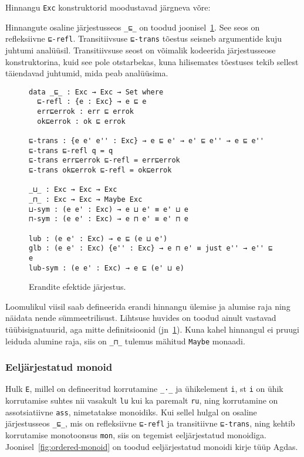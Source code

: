 \documentclass[a4paper,12pt]{article}
\begin{document}
Hinnangu {\tt Exc} konstruktorid moodustavad järgneva võre:
\begin{center}
\end{center}
Hinnangute osaline järjestusseos {\tt _⊑_} on toodud joonisel~\ref{fig:exc.ord}.
See seos on refleksiivne {\tt ⊑-refl}.
Transitiivsuse {\tt ⊑-trans} tõestus seisneb argumentide kuju juhtumi analüüsil.
Transitiivsuse seost on võimalik kodeerida järjestusseose konstruktorina, kuid see pole otstarbekas,
kuna hilisemates tõestuses tekib sellest täiendavad juhtumid, mida peab analüüsima.

\begin{figure}
  \begin{BVerbatim}
data _⊑_ : Exc → Exc → Set where
  ⊑-refl : {e : Exc} → e ⊑ e
  err⊑errok : err ⊑ errok
  ok⊑errok : ok ⊑ errok
  
⊑-trans : {e e' e'' : Exc} → e ⊑ e' → e' ⊑ e'' → e ⊑ e''
⊑-trans ⊑-refl q = q
⊑-trans err⊑errok ⊑-refl = err⊑errok
⊑-trans ok⊑errok ⊑-refl = ok⊑errok

_⊔_ : Exc → Exc → Exc
_⊓_ : Exc → Exc → Maybe Exc
⊔-sym : (e e' : Exc) → e ⊔ e' ≡ e' ⊔ e
⊓-sym : (e e' : Exc) → e ⊓ e' ≡ e' ⊓ e

lub : (e e' : Exc) → e ⊑ (e ⊔ e')
glb : (e e' : Exc) {e'' : Exc} → e ⊓ e' ≡ just e'' → e'' ⊑ e
lub-sym : (e e' : Exc) → e ⊑ (e' ⊔ e)
  \end{BVerbatim}
  \caption{Erandite efektide järjestus.}
  \label{fig:exc.ord}
\end{figure}
Loomulikul viisil saab defineerida erandi hinnangu ülemise ja alumise raja ning näidata nende sümmeetrilisust.
Lihtsuse huvides on toodud ainult vastavad tüübisignatuurid, aga mitte definitsioonid (jn~\ref{fig:exc.ord}).
Kuna kahel hinnangul ei pruugi leiduda alumine raja, siis on {\tt _⊓_} tulemus mähitud {\tt Maybe} monaadi.

\subsubsection{Eeljärjestatud monoid}\label{sssec:ordered-monoid}
Hulk {\tt E}, millel on defineeritud korrutamine {\tt _·_} ja ühikelement {\tt i},
st {\tt i} on ühik korrutamise suhtes nii vasakult {\tt lu} kui ka paremalt {\tt ru},
ning korrutamine on assotsiatiivne {\tt ass}, nimetatakse monoidiks.
Kui sellel hulgal on osaline järjestusseos {\tt _⊑_},
mis on refleksiivne {\tt ⊑-refl} ja transitiivne {\tt ⊑-trans},
ning kehtib korrutamise monotoonsus {\tt mon},
siis on tegemist eeljärjestatud monoidiga.
Joonisel~\ref{fig:ordered-monoid} on toodud eeljärjestatud monoidi kirje tüüp Agdas.
\end{document}
